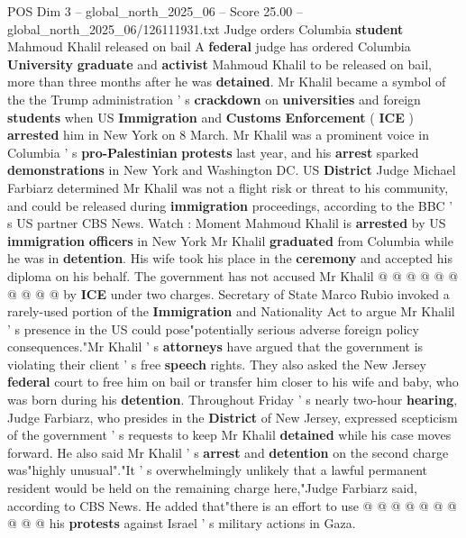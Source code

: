 \begin{textsample}{POS Dim 3 – global\_north\_2025\_06 – Score 25.00 – global\_north\_2025\_06/126111931.txt}  \label{ex:f3_pos_103}
Judge orders Columbia \textbf{student} Mahmoud Khalil released on bail A \textbf{federal} judge has ordered Columbia \textbf{University} \textbf{graduate} and \textbf{activist} Mahmoud Khalil to be released on bail, more than three months after he was \textbf{detained}.
Mr Khalil became a symbol of the the Trump administration ' s \textbf{crackdown} on \textbf{universities} and foreign \textbf{students} when US \textbf{Immigration} and \textbf{Customs} \textbf{Enforcement} ( \textbf{ICE} ) \textbf{arrested} him in New York on 8 March.
Mr Khalil was a prominent voice in Columbia ' s \textbf{pro-Palestinian} \textbf{protests} last year, and his \textbf{arrest} sparked \textbf{demonstrations} in New York and Washington DC.
US \textbf{District} Judge Michael Farbiarz determined Mr Khalil was not a flight risk or threat to his community, and could be released during \textbf{immigration} proceedings, according to the BBC ' s US partner CBS News.
Watch : Moment Mahmoud Khalil is \textbf{arrested} by US \textbf{immigration} \textbf{officers} in New York Mr Khalil \textbf{graduated} from Columbia while he was in \textbf{detention}.
His wife took his place in the \textbf{ceremony} and accepted his diploma on his behalf.
The government has not accused Mr Khalil @ @ @ @ @ @ @ @ @ @ by \textbf{ICE} under two charges.
Secretary of State Marco Rubio invoked a rarely-used portion of the \textbf{Immigration} and Nationality Act to argue Mr Khalil ' s presence in the US could pose"potentially serious adverse foreign policy consequences."Mr Khalil ' s \textbf{attorneys} have argued that the government is violating their client ' s free \textbf{speech} rights.
They also asked the New Jersey \textbf{federal} court to free him on bail or transfer him closer to his wife and baby, who was born during his \textbf{detention}.
Throughout Friday ' s nearly two-hour \textbf{hearing}, Judge Farbiarz, who presides in the \textbf{District} of New Jersey, expressed scepticism of the government ' s requests to keep Mr Khalil \textbf{detained} while his case moves forward.
He also said Mr Khalil ' s \textbf{arrest} and \textbf{detention} on the second charge was"highly unusual"."It ' s overwhelmingly unlikely that a lawful permanent resident would be held on the remaining charge here,"Judge Farbiarz said, according to CBS News.
He added that"there is an effort to use @ @ @ @ @ @ @ @ @ @ his \textbf{protests} against Israel ' s military actions in Gaza.

\end{textsample}

